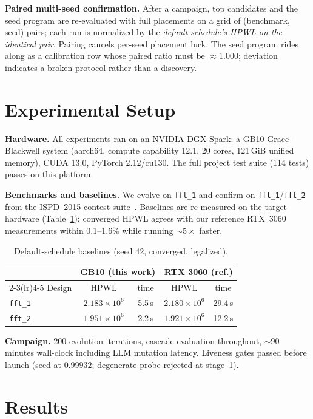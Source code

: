 \documentclass[conference]{IEEEtran}
\begin{document}
\textbf{Paired multi-seed confirmation.} After a campaign, top candidates
and the seed program are re-evaluated with full placements on a grid of
(benchmark, seed) pairs; each run is normalized by the \emph{default
schedule's HPWL on the identical pair}. Pairing cancels per-seed placement
luck. The seed program rides along as a calibration row whose paired ratio
must be ${\approx}1.000$; deviation indicates a broken protocol rather
than a discovery.

\section{Experimental Setup}

\textbf{Hardware.} All experiments ran on an NVIDIA DGX Spark: a GB10
Grace--Blackwell system (aarch64, compute capability 12.1, 20 cores,
121\,GiB unified memory), CUDA 13.0, PyTorch 2.12/cu130. The full
project test suite (114 tests) passes on this platform.

\textbf{Benchmarks and baselines.} We evolve on \texttt{fft\_1} and
confirm on \texttt{fft\_1}/\texttt{fft\_2} from the ISPD~2015 contest
suite~\cite{bustany2015ispd}. Baselines are re-measured on the target
hardware (Table~\ref{tab:baselines}); converged HPWL agrees with our
reference RTX~3060 measurements within 0.1--1.6\% while running
${\sim}5\times$ faster.

\begin{table}[t]
\centering
\caption{Default-schedule baselines (seed 42, converged, legalized).}
\label{tab:baselines}
\begin{tabular}{lcccc}
\toprule
 & \multicolumn{2}{c}{GB10 (this work)} & \multicolumn{2}{c}{RTX 3060 (ref.)} \\
\cmidrule(lr){2-3}\cmidrule(lr){4-5}
Design & HPWL & time & HPWL & time \\
\midrule
\texttt{fft\_1} & $2.183\times10^{6}$ & 5.5\,s & $2.180\times10^{6}$ & 29.4\,s \\
\texttt{fft\_2} & $1.951\times10^{6}$ & 2.2\,s & $1.921\times10^{6}$ & 12.2\,s \\
\bottomrule
\end{tabular}
\end{table}

\textbf{Campaign.} 200 evolution iterations, cascade evaluation
throughout, ${\sim}90$ minutes wall-clock including LLM mutation latency.
Liveness gates passed before launch (seed at $0.99932$; degenerate probe
rejected at stage~1).

\section{Results}
\end{document}
